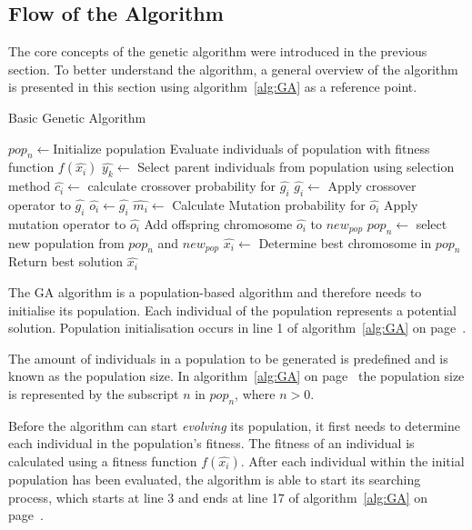\subsection{Flow of the Algorithm}
The core concepts of the genetic algorithm were introduced in the previous section. To better understand the algorithm, a general overview of the algorithm is presented in this section using algorithm~\ref{alg:GA} as a reference point.
\begin{algorithm}[H]
\caption{Basic Genetic Algorithm\cite{GAGoldberg, CompuIntelligenceIntro}}
\label{alg:GA}
	\begin{algorithmic}[1]
		\State $pop_n\leftarrow$Initialize population
    \State Evaluate individuals of population with fitness function $f(\hat{x_i})$
    \State $\hat{y_k} \leftarrow$ Select parent individuals from population using selection method
		\Repeat
    \State $\hat{c_i} \leftarrow$ calculate crossover probability for $\hat{g_i}$
    \State $\hat{g_i} \leftarrow$ Apply crossover operator to $\hat{g_i}$
    \EndIf
        \State $\hat{o_i} \leftarrow \hat{g_i}$
        \State $\hat{m_i}\leftarrow$ Calculate Mutation probability for $\hat{o_i}$
        \State Apply mutation operator to $\hat{o_i}$
				\EndIf
        \State Add offspring chromosome $\hat{o_i}$ to $new_{pop}$
			\EndFor
		\State $pop_n \leftarrow$ select new population from $pop_n$ and $new_{pop}$
		\EndWhile
    \State $\hat{x_i} \leftarrow$ Determine best chromosome in $pop_n$
    \State Return best solution $\hat{x_i}$
	\end{algorithmic}
\end{algorithm}
The \gls{GA} algorithm is a population-based algorithm and therefore needs to initialise its population. Each individual of the population represents a potential solution. Population initialisation occurs in line 1 of algorithm~\ref{alg:GA} on page~\pageref{alg:GA}. 

The amount of individuals in a population to be generated is predefined and is known as the population size. In algorithm~\ref{alg:GA} on page~\pageref{alg:GA} the population size is represented by the subscript $n$ in $pop_n$, where $n > 0$.

Before the algorithm can start \emph{evolving} its population, it first needs to determine each individual in the population's fitness. The fitness of an individual is calculated using a fitness function $f(\hat{x_i})$. After each individual within the initial population has been evaluated, the algorithm is able to start its searching process, which starts at line 3 and ends at line 17 of algorithm~\ref{alg:GA} on page~\pageref{alg:GA}.

